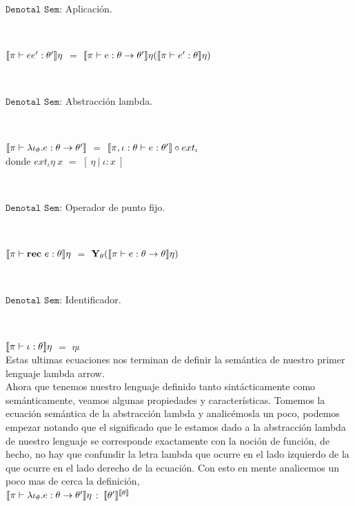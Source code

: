 \

\noindent
$\texttt{Denotal Sem:}$ Aplicaci\'on.\

\

$\llbracket \pi \vdash ee' : \theta' \rrbracket\eta$ $=$ $\llbracket \pi \vdash e : \theta \rightarrow \theta' \rrbracket\eta
														  (\llbracket \pi \vdash e' : \theta \rrbracket\eta)$

\

\noindent
$\texttt{Denotal Sem:}$ Abstracci\'on lambda.\

\

$\llbracket \pi \vdash \lambda \iota_{\theta} . e : \theta \rightarrow \theta' \rrbracket$ $=$
						$\llbracket \pi,\iota:\theta \vdash e : \theta' \rrbracket \circ ext_{\iota}$\\

donde $ext_{\iota} \eta \ x$ $=$ $[\ \eta \ | \ \iota:x \ ]$

\

\noindent
$\texttt{Denotal Sem:}$ Operador de punto fijo.\

\

$\llbracket \pi \vdash \textbf{rec} \ e : \theta \rrbracket\eta$ $=$ $\textbf{Y}_{\theta} (\llbracket \pi \vdash e : \theta \rightarrow \theta \rrbracket\eta)$

\

\noindent
$\texttt{Denotal Sem:}$ Identificador.\

\

$\llbracket \pi \vdash \iota : \theta \rrbracket\eta$ $=$ $\eta \iota$\\

Estas ultimas ecuaciones nos terminan de definir la sem\'antica de nuestro 
primer lenguaje lambda arrow.\\

Ahora que tenemos nuestro lenguaje definido tanto sint\'acticamente como
sem\'anticamente, veamos algunas propiedades y caracter\'isticas. Tomemos
la ecuaci\'on sem\'antica de la abstracci\'on lambda y analic\'emosla un 
poco, podemos empezar notando que el significado que le estamos dado
a la abstracci\'on lambda de nuestro lenguaje se corresponde exactamente
con la noci\'on de funci\'on, de hecho, no hay que confundir la letra lambda
que ocurre en el lado izquierdo de la que ocurre en el lado derecho de la
ecuaci\'on. Con esto en mente analicemos un poco mas de cerca la definici\'on,\\

$\llbracket \pi \vdash \lambda \iota_{\theta} . e : \theta \rightarrow \theta' \rrbracket\eta$ $:$
$\llbracket \theta' \rrbracket^{\llbracket \theta \rrbracket}$\\

